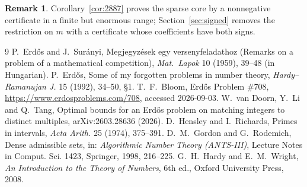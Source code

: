 \documentclass[11pt]{article}
\theoremstyle{definition}
\newtheorem{remark}[theorem]{Remark}
\begin{document}
\begin{remark}
Corollary~\ref{cor:2887} proves the sparse core by a nonnegative certificate in a finite but enormous range; Section~\ref{sec:signed}
removes the restriction on $m$ with a certificate whose coefficients have both signs.
\end{remark}









\begin{thebibliography}{9}
 P.~Erd\H{o}s and J.~Sur\'anyi, Megjegyz\'esek egy versenyfeladathoz (Remarks on a problem of a
mathematical competition), \emph{Mat.\ Lapok} 10 (1959), 39--48 (in Hungarian).
 P.~Erd\H{o}s, Some of my forgotten problems in number theory, \emph{Hardy--Ramanujan J.} 15
(1992), 34--50, \S1.
 T.~F.~Bloom, Erd\H{o}s Problem \#708, \url{https://www.erdosproblems.com/708}, accessed 2026-09-03.
 W.~van Doorn, Y.~Li and Q.~Tang, Optimal bounds for an Erd\H{o}s problem on matching integers
to distinct multiples, arXiv:2603.28636 (2026).
 D.~Hensley and I.~Richards, Primes in intervals, \emph{Acta Arith.} 25 (1974), 375--391.
 D.~M.~Gordon and G.~Rodemich, Dense admissible sets, in: \emph{Algorithmic Number Theory (ANTS-III)}, Lecture Notes in Comput. Sci. 1423, Springer, 1998, 216--225.
 G.~H.~Hardy and E.~M.~Wright, \emph{An Introduction to the Theory of Numbers}, 6th ed., Oxford University Press, 2008.
\end{thebibliography}
\end{document}
